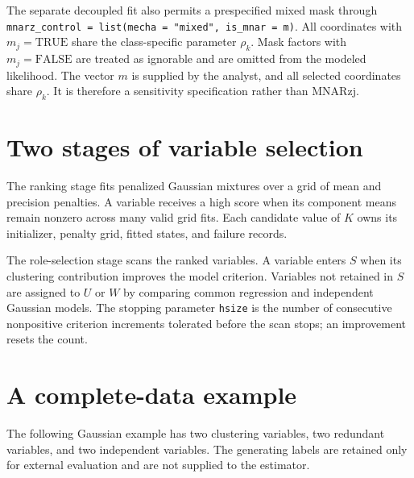 \documentclass[10pt]{article}\usepackage[]{graphicx}\usepackage[]{xcolor}
\begin{document}
The separate decoupled fit also permits a prespecified mixed mask through
\texttt{mnarz\_control = list(mecha = "mixed", is\_mnar = m)}. All
coordinates with $m_j=\mathrm{TRUE}$ share the class-specific parameter
$\rho_k$. Mask factors with $m_j=\mathrm{FALSE}$ are treated as ignorable and
are omitted from the modeled likelihood. The vector $m$ is supplied by the
analyst, and all selected coordinates share $\rho_k$. It is therefore a
 sensitivity specification rather than MNARzj.

\section{Two stages of variable selection}

The ranking stage fits penalized Gaussian mixtures over a grid of mean and
precision penalties. A variable receives a high score when its component
means remain nonzero across many valid grid fits. Each candidate value of $K$
owns its initializer, penalty grid, fitted states, and failure records.

The role-selection stage scans the ranked variables. A variable enters $S$
when its clustering contribution improves the model criterion. Variables not
retained in $S$ are assigned to $U$ or $W$ by comparing common regression and
independent Gaussian models. The stopping parameter \texttt{hsize} is the
number of consecutive nonpositive criterion increments tolerated before the
scan stops; an improvement resets the count.

\section{A complete-data example}

The following Gaussian example has two clustering variables, two redundant
variables, and two independent variables. The generating labels are retained
only for external evaluation and are not supplied to the estimator.
\end{document}
